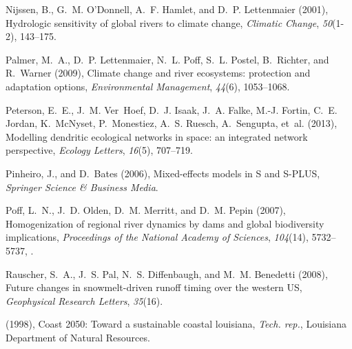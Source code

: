 \documentclass[linenumbers,draft]{AGUJournal}
\begin{document}
\begin{thebibliography}{30}
Nijssen, B., G.~M. O'Donnell, A.~F. Hamlet, and D.~P. Lettenmaier (2001),
  Hydrologic sensitivity of global rivers to climate change, \textit{Climatic
  Change}, \textit{50}(1-2), 143--175.

Palmer, M.~A., D.~P. Lettenmaier, N.~L. Poff, S.~L. Postel, B.~Richter, and
  R.~Warner (2009), Climate change and river ecosystems: protection and
  adaptation options, \textit{Environmental Management}, \textit{44}(6),
  1053--1068.

Peterson, E.~E., J.~M. Ver~Hoef, D.~J. Isaak, J.~A. Falke, M.-J. Fortin, C.~E.
  Jordan, K.~McNyset, P.~Monestiez, A.~S. Ruesch, A.~Sengupta, et~al. (2013),
  Modelling dendritic ecological networks in space: an integrated network
  perspective, \textit{Ecology Letters}, \textit{16}(5), 707--719.

Pinheiro, J., and D.~Bates (2006), Mixed-effects models in {S} and {S-PLUS},
  \textit{Springer Science \& Business Media}.

Poff, L.~N., J.~D. Olden, D.~M. Merritt, and D.~M. Pepin (2007), Homogenization
  of regional river dynamics by dams and global biodiversity implications,
  \textit{Proceedings of the National Academy of Sciences}, \textit{104}(14),
  5732--5737, .

Rauscher, S.~A., J.~S. Pal, N.~S. Diffenbaugh, and M.~M. Benedetti (2008),
  Future changes in snowmelt-driven runoff timing over the western {US},
  \textit{Geophysical Research Letters}, \textit{35}(16).

 (1998), Coast 2050:
  {T}oward a sustainable coastal louisiana, \textit{Tech. rep.}, Louisiana
  Department of Natural Resources.


\end{thebibliography}
\end{document}
